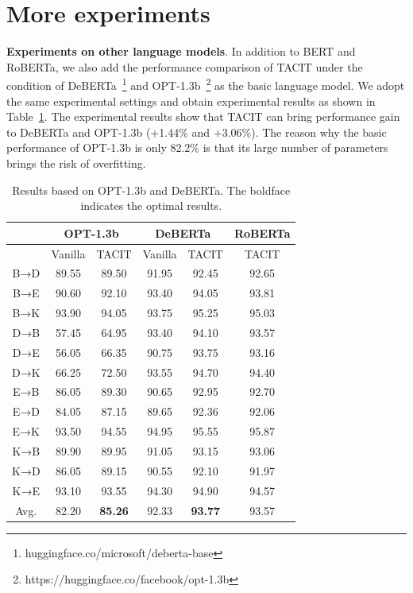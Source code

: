\documentclass[letterpaper]{article} %
\begin{document}
\section{More experiments} \label{app:b}
\textbf{Experiments on other language models}. In addition to BERT and RoBERTa, we also add the performance comparison of TACIT under the condition of DeBERTa~\cite{HeLGC21}\footnote{huggingface.co/microsoft/deberta-base} and OPT-1.3b~\cite{OPT}\footnote{https://huggingface.co/facebook/opt-1.3b} as the basic language model. We adopt the same experimental settings and obtain experimental results as shown in Table~\ref{tab:a1}. The experimental results show that TACIT can bring performance gain to DeBERTa and OPT-1.3b (+1.44\% and +3.06\%). The reason why the basic performance of OPT-1.3b is only 82.2\% is that its large number of parameters brings the risk of overfitting.
\begin{table}[htbp]
	\renewcommand{\arraystretch}{0.9}
	\setlength\tabcolsep{1.3mm}
	\centering
	\begin{tabular}{ccc|cc|c} \hline \hline
		& \multicolumn{2}{c}{OPT-1.3b} & \multicolumn{2}{c}{DeBERTa} & \multicolumn{1}{c}{RoBERTa} \\ \hline
		& \multicolumn{1}{l}{Vanilla} & \multicolumn{1}{l}{TACIT} & Vanilla & TACIT & \multicolumn{1}{c}{TACIT} \\ \hline
		B→D   & 89.55 & 89.50 & 91.95 & 92.45 & 92.65 \\
		B→E   & 90.60  & 92.10 & 93.40 & 94.05 & 93.81 \\
		B→K   & 93.90 & 94.05 & 93.75 & 95.25 & 95.03 \\
		D→B   & 57.45 & 64.95 & 93.40 & 94.10 & 93.57 \\
		D→E   & 56.05 & 66.35 & 90.75 & 93.75 & 93.16 \\
		D→K   & 66.25 & 72.50 & 93.55 & 94.70 & 94.40 \\
		E→B   & 86.05 & 89.30 & 90.65 & 92.95 & 92.70 \\
		E→D   & 84.05 & 87.15 & 89.65 & 92.36 & 92.06 \\
		E→K   & 93.50 & 94.55 & 94.95 & 95.55 & 95.87 \\
		K→B   & 89.90 & 89.95 & 91.05 & 93.15 & 93.06 \\
		K→D   & 86.05 & 89.15 & 90.55 & 92.10 & 91.97 \\
		K→E   & 93.10 & 93.55 & 94.30 & 94.90 & 94.57 \\ \hline
		Avg.  & 82.20 & \textbf{85.26} & 92.33 & \textbf{93.77} & 93.57 \\
		\hline \hline
	\end{tabular}%
	\caption{Results based on OPT-1.3b and DeBERTa. The boldface indicates the optimal
		results.}
	\label{tab:a1}%
\end{table}%
\end{document}
